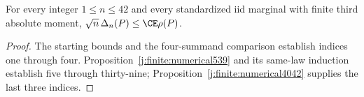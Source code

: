 \begin{theorem}\label{j:finite:base}
For every integer $1\le n\le42$ and every standardized iid marginal
with finite third absolute moment, $\sqrt n\,\Delta_n(P)\le\CE\rho(P)$.
\end{theorem}
\begin{proof}
The starting bounds and the four-summand comparison establish indices
one through four. Proposition~\ref{j:finite:numerical539} and its
same-law induction establish five through thirty-nine;
Proposition~\ref{j:finite:numerical4042} supplies the last three indices.
\end{proof}
